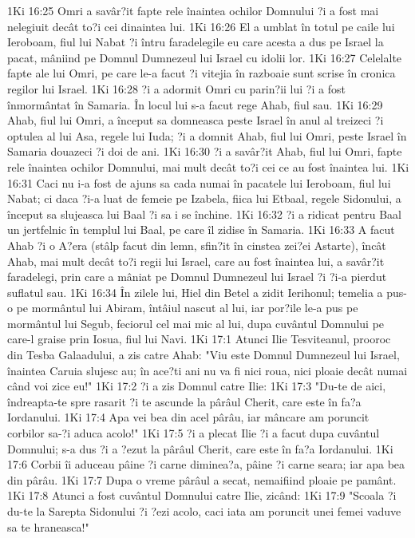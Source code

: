 1Ki 16:25  Omri a savâr?it fapte rele înaintea ochilor Domnului ?i a fost mai nelegiuit decât to?i cei dinaintea lui.
1Ki 16:26  El a umblat în totul pe caile lui Ieroboam, fiul lui Nabat ?i întru faradelegile eu care acesta a dus pe Israel la pacat, mâniind pe Domnul Dumnezeul lui Israel cu idolii lor.
1Ki 16:27  Celelalte fapte ale lui Omri, pe care le-a facut ?i vitejia în razboaie sunt scrise în cronica regilor lui Israel.
1Ki 16:28  ?i a adormit Omri cu parin?ii lui ?i a fost înmormântat în Samaria. În locul lui s-a facut rege Ahab, fiul sau.
1Ki 16:29  Ahab, fiul lui Omri, a început sa domneasca peste Israel în anul al treizeci ?i optulea al lui Asa, regele lui Iuda; ?i a domnit Ahab, fiul lui Omri, peste Israel în Samaria douazeci ?i doi de ani.
1Ki 16:30  ?i a savâr?it Ahab, fiul lui Omri, fapte rele înaintea ochilor Domnului, mai mult decât to?i cei ce au fost înaintea lui.
1Ki 16:31  Caci nu i-a fost de ajuns sa cada numai în pacatele lui Ieroboam, fiul lui Nabat; ci daca ?i-a luat de femeie pe Izabela, fiica lui Etbaal, regele Sidonului, a început sa slujeasca lui Baal ?i sa i se închine.
1Ki 16:32  ?i a ridicat pentru Baal un jertfelnic în templul lui Baal, pe care îl zidise în Samaria.
1Ki 16:33  A facut Ahab ?i o A?era (stâlp facut din lemn, sfin?it în cinstea zei?ei Astarte), încât Ahab, mai mult decât to?i regii lui Israel, care au fost înaintea lui, a savâr?it faradelegi, prin care a mâniat pe Domnul Dumnezeul lui Israel ?i ?i-a pierdut suflatul sau.
1Ki 16:34  În zilele lui, Hiel din Betel a zidit Ierihonul; temelia a pus-o pe mormântul lui Abiram, întâiul nascut al lui, iar por?ile le-a pus pe mormântul lui Segub, feciorul cel mai mic al lui, dupa cuvântul Domnului pe care-l graise prin Iosua, fiul lui Navi.
1Ki 17:1  Atunci Ilie Tesviteanul, prooroc din Tesba Galaadului, a zis catre Ahab: "Viu este Domnul Dumnezeul lui Israel, înaintea Caruia slujesc au; în ace?ti ani nu va fi nici roua, nici ploaie decât numai când voi zice eu!"
1Ki 17:2  ?i a zis Domnul catre Ilie:
1Ki 17:3  "Du-te de aici, îndreapta-te spre rasarit ?i te ascunde la pârâul Cherit, care este în fa?a Iordanului.
1Ki 17:4  Apa vei bea din acel pârâu, iar mâncare am poruncit corbilor sa-?i aduca acolo!"
1Ki 17:5  ?i a plecat Ilie ?i a facut dupa cuvântul Domnului; s-a dus ?i a ?ezut la pârâul Cherit, care este în fa?a Iordanului.
1Ki 17:6  Corbii îi aduceau pâine ?i carne diminea?a, pâine ?i carne seara; iar apa bea din pârâu.
1Ki 17:7  Dupa o vreme pârâul a secat, nemaifiind ploaie pe pamânt.
1Ki 17:8  Atunci a fost cuvântul Domnului catre Ilie, zicând:
1Ki 17:9  "Scoala ?i du-te la Sarepta Sidonului ?i ?ezi acolo, caci iata am poruncit unei femei vaduve sa te hraneasca!"
